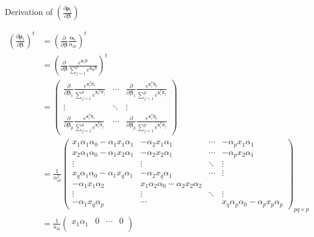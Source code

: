 \documentclass[10pt]{article}
\theoremstyle{definition}
\begin{document}
 Derivation of $\left(\frac{\partial  \boldsymbol\mu_i }{\partial \boldsymbol\beta }\right)$

\begin{align*}
  \left(\frac{\partial  \boldsymbol\mu_i }{\partial \boldsymbol\beta}\right)^t &= \left(\frac{\partial  }{\partial \boldsymbol \beta} \frac{\boldsymbol\alpha_{i}}{\alpha_{i0}} \right)^t\\
  &= \left(\frac{\partial  }{\partial \boldsymbol \beta} \frac{e^{\mathbf{x}_i \boldsymbol\beta}}{\sum_{j = 1}^pe^{\mathbf{x_{ij}}\boldsymbol\beta}} \right)^t\\
  &= \begin{pmatrix}
        \frac{\partial }{\partial \boldsymbol\beta_1}\frac{e^{\mathbf{x}_i^T \boldsymbol\beta_1}}{\sum_{j = 1}^pe^{\mathbf{x_i}^T \boldsymbol\beta_j}} & \cdots & \frac{\partial  }{\partial \boldsymbol\beta_1}\frac{e^{\mathbf{x}_i^T \boldsymbol\beta_p}}{\sum_{j = 1}^pe^{\mathbf{x}_i^T \boldsymbol\beta_j}}\\
        \vdots & \ddots & \vdots \\
        \frac{\partial  }{\partial \boldsymbol\beta_p}\frac{e^{\mathbf{x}_i^T \boldsymbol\beta_1}}{\sum_{j = 1}^pe^{\mathbf{x}_i^T \boldsymbol\beta_j}} & \cdots & \frac{\partial  }{\partial \boldsymbol\beta_p}\frac{e^{\mathbf{x}_i^T \boldsymbol\beta_p}}{\sum_{j = 1}^pe^{\mathbf{x}_i^T \boldsymbol\beta_j}}
  \end{pmatrix}\\
  &= \frac{1}{\alpha_{i0}^2} \begin{pmatrix} x_1 \alpha_1 \alpha_0 - \alpha_1 x_1 \alpha_1 & - \alpha_2 x_1 \alpha_1 & \cdots & - \alpha_p x_1 \alpha_1 \\
x_2 \alpha_1 \alpha_0 - \alpha_1 x_2 \alpha_1 & - \alpha_2 x_2 \alpha_1 & \cdots & -\alpha_p x_2 \alpha_1 \\
\vdots & \vdots &  \ddots & \vdots \\
x_q\alpha_1\alpha_0 - \alpha_1 x_q\alpha_1 & - \alpha_2 x_q \alpha_1 &  \cdots  & \vdots  \\
- \alpha_1x_1\alpha_2 & x_1 \alpha_2\alpha_0 - \alpha_2 x_2\alpha_2 &   & \\
\vdots & \vdots & \ddots & \vdots \\
- \alpha_1x_q\alpha_p & \cdots  & & x_q\alpha_p\alpha_0 - \alpha_px_p\alpha_p
\end{pmatrix}_{pq \times p}\\
&= \frac{1}{a_{i0}} \begin{pmatrix}x_1 \alpha_1 & 0 & \cdots & 0 \\

\end{pmatrix}
\end{align*}
\end{document}

